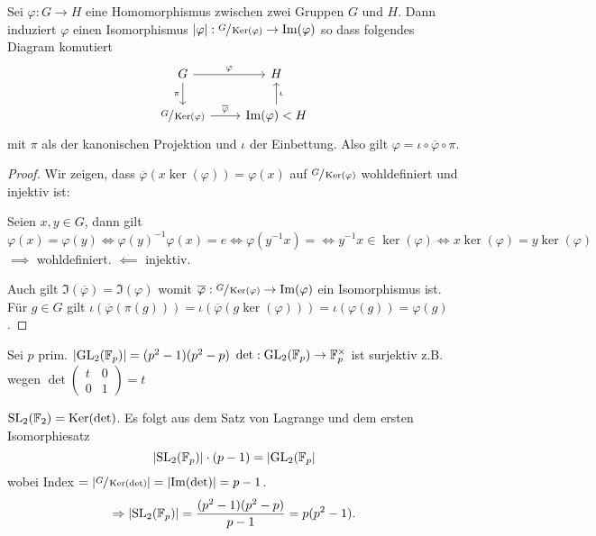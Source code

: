 \begin{theorem}
	Sei $\varphi: G \to H$ eine Homomorphismus zwischen zwei Gruppen $G$ und $H$.
	Dann induziert $\varphi$ einen Isomorphismus $\abs{\varphi}: \sfrac{G}{\operatorname{Ker}(\varphi)} \to  \Im(\varphi)$ so dass 
	folgendes Diagram komutiert
	\[
	\begin{tikzcd}
		G \arrow[d, "\pi"'] \arrow[r, "\varphi"]                 & H                                    \\
	\sfrac{G}{\ker(\varphi)} \arrow[r, "\overline{\varphi}"] & \Im(\varphi) < H \arrow[u, "\iota"']
		\end{tikzcd}
	\] 
	mit $\pi$ als der kanonischen Projektion und $\iota$ der Einbettung.
	Also gilt $\varphi = \iota \circ \overline{\varphi} \circ \pi$.
\end{theorem}

\begin{proof}
	Wir zeigen, dass $\overline{\varphi}(x \ker(\varphi)) = \varphi(x)$ auf $\sfrac{G}{\operatorname{Ker}(\varphi)}$ wohldefiniert und injektiv ist:

	Seien $x,y \in G$, dann gilt 
	\[
		\varphi(x) = \varphi(y) \Leftrightarrow \varphi(y)^{-1} \varphi(x) = e \Leftrightarrow \varphi(y^{-1} x) = \Leftrightarrow y^{-1} x \in \ker(\varphi) \Leftrightarrow
		x \ker(\varphi) = y \ker(\varphi)
	\]
	$\implies$ wohldefiniert. $\impliedby$ injektiv.

	Auch gilt $\Im(\overline{\varphi}) = \Im(\varphi)$ womit $\overline{\varphi}: \sfrac{G}{\operatorname{Ker}(\varphi)} \to \Im(\varphi)$ ein Isomorphismus ist.
	Für $g \in G$ gilt $\iota(\overline{\varphi}(\pi(g))) = \iota(\overline{\varphi}(g \ker(\varphi))) = \iota(\varphi(g)) = \varphi(g)$.
\end{proof}

\begin{eg}
	Sei $p$ prim. $\abs{\operatorname{GL}_{2}(\mathbb{F}_{p})} = (p^2 -1)(p^2 - p)$
	$\det: \operatorname{GL}_{2}(\mathbb{F}_{p}) \to \mathbb{F}_{p}^{\times}$ ist surjektiv z.B. wegen $\det\begin{pmatrix} 
		t & 0\\ 0 & 1
	\end{pmatrix} = t$ 

	$\operatorname{SL}_2(\mathbb{F}_{2}) = \operatorname{Ker}(\det)$. Es folgt aus dem Satz von Lagrange und dem ersten Isomorphiesatz 
	\[
		\abs{\operatorname{SL}_2(\mathbb{F}_{p})} \cdot (p-1) = \abs{\operatorname{GL}_2(\mathbb{F}_{p}}
	\]
	wobei Index $= \abs{\sfrac{G}{\operatorname{Ker}(\det)}} = \abs{\Im(\det)} = p-1$.
	\[
		\Rightarrow \abs{\operatorname{SL}_2(\mathbb{F}_{p})} = \frac{(p^2-1)(p^2-p)}{p-1} = p (p^2-1)
	.\] 
\end{eg}

